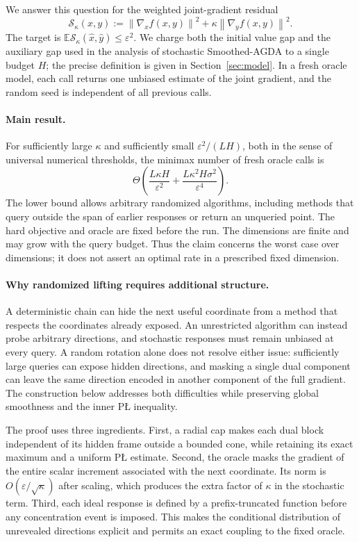 \documentclass[11pt,a4paper]{article}
\newcommand{\E}{\mathbb E}
\newcommand{\eps}{\varepsilon}
\newcommand{\norm}[1]{\left\lVert #1\right\rVert}
\newcommand{\res}{\mathcal S_\kappa}
\theoremstyle{definition}
\theoremstyle{remark}
\numberwithin{equation}{section}
\begin{document}
We answer this question for the weighted joint-gradient residual
\begin{equation}
 \res(x,y):=\norm{\nabla_x f(x,y)}^2
                +\kappa\norm{\nabla_y f(x,y)}^2.
 \label{eq:residual}
\end{equation}
The target is $\E\res(\widehat x,\widehat y)\le\eps^2$.
We charge both the initial value gap and the auxiliary gap used in the
analysis of stochastic Smoothed-AGDA to a single budget $H$; the precise
definition is given in Section~\ref{sec:model}. In a fresh oracle model,
each call returns one unbiased estimate of the joint gradient, and the
random seed is independent of all previous calls.

\paragraph{Main result.}
For sufficiently large $\kappa$ and sufficiently small
$\eps^2/(LH)$, both in the sense of universal numerical thresholds,
the minimax number of fresh oracle calls is
\begin{equation}
 \Theta\!\left(
 \frac{L\kappa H}{\eps^2}
 +\frac{L\kappa^2H\sigma^2}{\eps^4}
 \right).
 \label{eq:intro-rate}
\end{equation}
The lower bound allows arbitrary randomized algorithms, including
methods that query outside the span of earlier responses or return an
unqueried point. The hard objective and oracle are fixed before the run.
The dimensions are finite and may grow with the query budget. Thus the
claim concerns the worst case over dimensions; it does not assert an
optimal rate in a prescribed fixed dimension.

\paragraph{Why randomized lifting requires additional structure.}
A deterministic chain can hide the next useful coordinate from a
method that respects the coordinates already exposed. An unrestricted
algorithm can instead probe arbitrary directions, and stochastic
responses must remain unbiased at every query. A random rotation alone
does not resolve either issue: sufficiently large queries can expose
hidden directions, and masking a single dual component can leave the
same direction encoded in another component of the full gradient.
The construction below addresses both difficulties while preserving
global smoothness and the inner P\L{} inequality.

The proof uses three ingredients. First, a radial cap makes each dual
block independent of its hidden frame outside a bounded cone, while
retaining its exact maximum and a uniform P\L{} estimate. Second, the
oracle masks the gradient of the entire scalar increment associated
with the next coordinate. Its norm is $O(\eps/\sqrt\kappa)$ after
scaling, which produces the extra factor of $\kappa$ in the stochastic
term. Third, each ideal response is defined by a prefix-truncated
function before any concentration event is imposed. This makes the
conditional distribution of unrevealed directions explicit and permits
an exact coupling to the fixed oracle.
\end{document}
